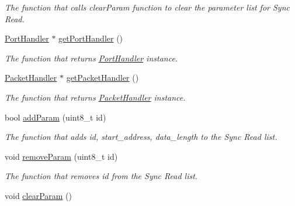 \begin{DoxyCompactItemize}
\begin{DoxyCompactList}\small\item\em The function that calls clear\+Param function to clear the parameter list for Sync Read. \end{DoxyCompactList}\item 
\hyperlink{classmercury_1_1_port_handler}{Port\+Handler} $\ast$ \hyperlink{classmercury_1_1_read_composite_a921a6d4aafc500c0655aa818e208037a}{get\+Port\+Handler} ()
\begin{DoxyCompactList}\small\item\em The function that returns \hyperlink{classmercury_1_1_port_handler}{Port\+Handler} instance. \end{DoxyCompactList}\item 
\hyperlink{classmercury_1_1_packet_handler}{Packet\+Handler} $\ast$ \hyperlink{classmercury_1_1_read_composite_a46a4eb238028d2af989e512b4141d8aa}{get\+Packet\+Handler} ()
\begin{DoxyCompactList}\small\item\em The function that returns \hyperlink{classmercury_1_1_packet_handler}{Packet\+Handler} instance. \end{DoxyCompactList}\item 
bool \hyperlink{classmercury_1_1_read_composite_af997f1fef18317302b0af5f76349d625}{add\+Param} (uint8\+\_\+t id)
\begin{DoxyCompactList}\small\item\em The function that adds id, start\+\_\+address, data\+\_\+length to the Sync Read list. \end{DoxyCompactList}\item 
void \hyperlink{classmercury_1_1_read_composite_a6c52412a069891a32498800b87680dcf}{remove\+Param} (uint8\+\_\+t id)
\begin{DoxyCompactList}\small\item\em The function that removes id from the Sync Read list. \end{DoxyCompactList}\item 
void \hyperlink{classmercury_1_1_read_composite_aa6ce3d2726b5afe062f96c742f60cdf6}{clear\+Param} ()\hypertarget{classmercury_1_1_read_composite_aa6ce3d2726b5afe062f96c742f60cdf6}{}\label{classmercury_1_1_read_composite_aa6ce3d2726b5afe062f96c742f60cdf6}


\end{DoxyCompactItemize}
